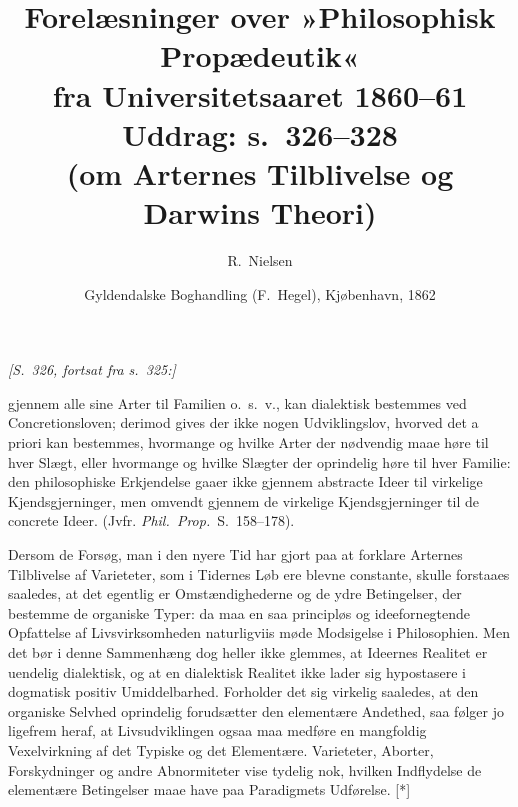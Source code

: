 \documentclass[12pt,a4paper]{article}
\title{\textbf{Forelæsninger over »Philosophisk Propædeutik«}\\[0.4em]
\large fra Universitetsaaret 1860--61\\[0.3em]
\normalsize Uddrag: s.\ 326--328\\
(om Arternes Tilblivelse og Darwins Theori)}
\author{R.\ Nielsen}
\date{Gyldendalske Boghandling (F.\ Hegel), Kjøbenhavn, 1862}
\begin{document}
\maketitle
\thispagestyle{fancy}

\bigskip

%
%
%

\noindent\textit{[S.\ 326, fortsat fra s.\ 325:]}

\medskip

\noindent gjennem alle sine Arter til Familien o.\ s.\ v., kan
dialektisk bestemmes ved Concretionsloven; derimod gives der ikke
nogen Udviklingslov, hvorved det a priori kan bestemmes,
hvormange og hvilke Arter der nødvendig maae høre til hver Slægt,
eller hvormange og hvilke Slægter der oprindelig høre til hver
Familie: den philosophiske Erkjendelse gaaer ikke gjennem
abstracte Ideer til virkelige Kjendsgjerninger, men omvendt
gjennem de virkelige Kjendsgjerninger til de concrete Ideer.
(Jvfr. \emph{Phil.\ Prop.}\ S.\ 158--178).

Dersom de Forsøg, man i den nyere Tid har gjort paa at forklare
Arternes Tilblivelse af Varieteter, som i Tidernes Løb ere blevne
constante, skulle forstaaes saaledes, at det egentlig er
Omstændighederne og de ydre Betingelser, der bestemme de organiske
Typer: da maa en saa principløs og ideefornegtende Opfattelse af
Livsvirksomheden naturligviis møde Modsigelse i Philosophien. Men
det bør i denne Sammenhæng dog heller ikke glemmes, at Ideernes
Realitet er uendelig dialektisk, og at en dialektisk Realitet ikke
lader sig hypostasere i dogmatisk positiv Umiddelbarhed. Forholder
det sig virkelig saaledes, at den organiske Selvhed oprindelig
forudsætter den elementære Andethed, saa følger jo ligefrem heraf,
at Livsudviklingen ogsaa maa medføre en mangfoldig Vexelvirkning
af det Typiske og det Elementære. Varieteter, Aborter,
Forskydninger og andre Abnormiteter vise tydelig nok, hvilken
Indflydelse de elementære Betingelser maae have paa Paradigmets
Udførelse. [*]
\end{document}
